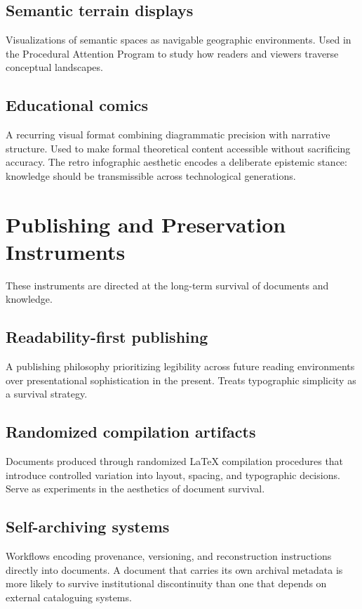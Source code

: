 \documentclass[12pt, openany]{book}
\begin{document}
\subsection{Semantic terrain displays} Visualizations of semantic spaces
as navigable geographic environments. Used in the Procedural Attention
Program to study how readers and viewers traverse conceptual landscapes.

\subsection{Educational comics} A recurring visual format combining
diagrammatic precision with narrative structure. Used to make formal
theoretical content accessible without sacrificing accuracy. The retro
infographic aesthetic encodes a deliberate epistemic stance: knowledge
should be transmissible across technological generations.

\section{Publishing and Preservation Instruments}

These instruments are directed at the long-term survival of documents
and knowledge.

\subsection{Readability-first publishing} A publishing philosophy
prioritizing legibility across future reading environments over
presentational sophistication in the present. Treats typographic simplicity
as a survival strategy.

\subsection{Randomized compilation artifacts} Documents produced through
randomized \LaTeX{} compilation procedures that introduce controlled
variation into layout, spacing, and typographic decisions. Serve as
experiments in the aesthetics of document survival.

\subsection{Self-archiving systems} Workflows encoding provenance,
versioning, and reconstruction instructions directly into documents.
A document that carries its own archival metadata is more likely to survive
institutional discontinuity than one that depends on external cataloguing
systems.
\end{document}
